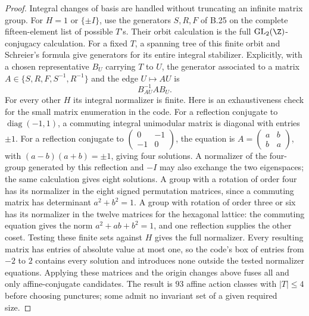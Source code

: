 \begin{proof}
Integral changes of basis are handled without truncating an infinite
matrix group.  For $H=1$ or $\{\pm I\}$, use the generators $S,R,F$
of B.25 on the complete fifteen-element list of possible $T$'s.
Their orbit calculation is the full $\mathrm{GL}_2(\Z)$-conjugacy
calculation.  For a fixed $T$, a spanning tree of this finite orbit
and Schreier's formula give generators for its entire integral
stabilizer.  Explicitly, with a chosen representative $B_U$ carrying
$T$ to $U$, the generator associated to a matrix $A\in\{S,R,F,S^{-1},R^{-1}\}$
and the edge $U\mapsto AU$ is
\[
                       B_{AU}^{-1}AB_U.                \tag{B.27.4}
\]
For every other $H$ its integral normalizer is finite.  Here is an
exhaustiveness check for the small matrix enumeration in the code.
For a reflection conjugate to $\operatorname{diag}(-1,1)$, a commuting
integral unimodular matrix is diagonal with entries $\pm1$.
For a reflection conjugate to
$\left(\begin{smallmatrix}0&-1\\-1&0\end{smallmatrix}\right)$,
the equation is $A=\left(\begin{smallmatrix}a&b\\b&a\end{smallmatrix}\right)$,
with $(a-b)(a+b)=\pm1$, giving four solutions.  A normalizer of the
four-group generated by this reflection and $-I$ may also exchange
the two eigenspaces; the same calculation gives eight solutions.
A group with a rotation of order four has its normalizer in the eight
signed permutation matrices, since a commuting matrix has determinant
$a^2+b^2=1$.  A group with rotation of order three or six has its
normalizer in the twelve matrices for the hexagonal lattice: the
commuting equation gives the norm $a^2+ab+b^2=1$, and one reflection
supplies the other coset.  Testing these finite sets against $H$
gives the full normalizer.  Every resulting matrix has entries of
absolute value at most one, so the code's box of entries from $-2$
to $2$ contains every solution and introduces none outside the tested
normalizer equations.  Applying these matrices and the origin changes
above fuses all and only affine-conjugate candidates.
The result is $93$ affine action classes with $|T|\le4$ before choosing
punctures; some admit no invariant set of a given required size.


\end{proof}
